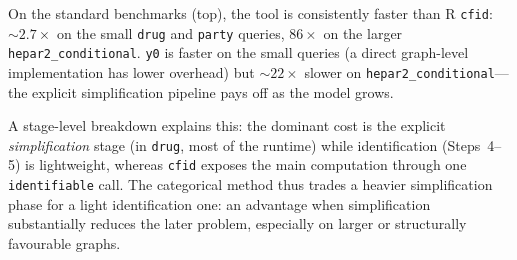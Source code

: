 \documentclass[runningheads]{llncs}
\begin{document}
\begin{center}
\vspace{-0.8em}
\vspace{-0.8em}
\end{center}

On the standard benchmarks (top), the tool is consistently faster than R \texttt{cfid}: ${\sim}2.7\times$ on the small \texttt{drug} and \texttt{party} queries, $86\times$ on the larger \texttt{hepar2\_conditional}. \texttt{y0} is faster on the small queries (a direct graph-level implementation has lower overhead) but ${\sim}22\times$ slower on \texttt{hepar2\_conditional}---the explicit simplification pipeline pays off as the model grows.

A stage-level breakdown explains this: the dominant cost is the explicit \emph{simplification} stage (in \texttt{drug}, most of the runtime) while identification (Steps~4--5) is lightweight, whereas \texttt{cfid} exposes the main computation through one \texttt{identifiable} call. The categorical method thus trades a heavier simplification phase for a light identification one: an advantage when simplification substantially reduces the later problem, especially on larger or structurally favourable graphs.
\end{document}
